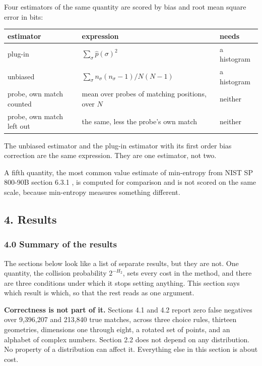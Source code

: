 Four estimators of the same quantity are scored by bias and root mean square error in bits:

\tiny
\setlength{\tabcolsep}{2pt}
\begin{longtable}{@{}>{\raggedright\arraybackslash}p{}>{\raggedright\arraybackslash}p{}>{\raggedright\arraybackslash}p{}@{}}
\toprule
estimator & expression & needs \\
\midrule
plug-in & \(\sum_\sigma \hat p(\sigma)^2\) & a histogram \\
unbiased & \(\sum_\sigma n_\sigma(n_\sigma-1) / N(N-1)\) & a histogram \\
probe, own match counted & mean over probes of matching positions, over \(N\) & neither \\
probe, own match left out & the same, less the probe's own match & neither \\
\bottomrule
\end{longtable}
\normalsize

The unbiased estimator and the plug-in estimator with its first order bias correction are the same expression. They are one estimator, not two.

A fifth quantity, the most common value estimate of min-entropy from NIST SP 800-90B section 6.3.1 \cite{src:NIST-SP-800-90B}, is computed for comparison and is not scored on the same scale, because min-entropy measures something different.

\subsection{4. Results}

\subsubsection{4.0 Summary of the results}

The sections below look like a list of separate results, but they are not. One quantity, the collision probability \(2^{-H_2}\), sets every cost in the method, and there are three conditions under which it stops setting anything. This section says which result is which, so that the rest reads as one argument.

\noindent\textbf{Correctness is not part of it.} Sections 4.1 and 4.2 report zero false negatives over 9,396,207 and 213,840 true matches, across three choice rules, thirteen geometries, dimensions one through eight, a rotated set of points, and an alphabet of complex numbers. Section 2.2 does not depend on any distribution. No property of a distribution can affect it. Everything else in this section is about cost.

